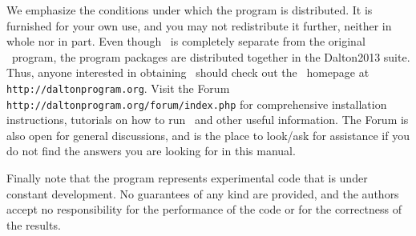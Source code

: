 \vspace{0.5 cm}

We emphasize the conditions under which the
program is distributed.  It is furnished for your own use,
and you may not redistribute it further, neither in whole nor in
part.  Even though \lsdalton\ is completely separate from the original
\dalton\ program, the program packages are distributed together in the
Dalton2013 suite. Thus, 
anyone interested in obtaining \lsdalton\ should check out the
\dalton\ homepage at
\verb|http://daltonprogram.org|. Visit the Forum
\verb|http://daltonprogram.org/forum/index.php| for comprehensive 
installation instructions, tutorials on how to run \lsdalton\ and other 
useful information. The Forum is also open for general discussions, and 
is the place to look/ask for assistance if you do not find the answers 
you are looking for in this manual.

Finally note that the
program represents experimental code that is
under constant development.  No guarantees of any kind are
provided, and the authors accept no responsibility for the
performance of the code or for the correctness of the results.


